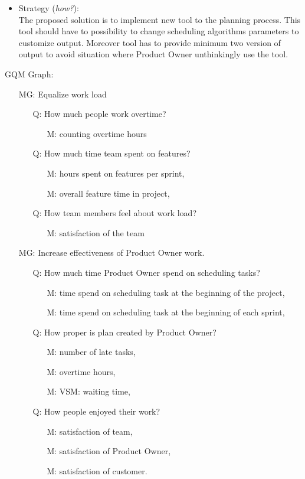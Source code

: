 \begin{itemize}
\item Strategy (\textit{how?}):\\
The proposed solution is to implement new tool to the planning process. This tool should have to possibility to change scheduling algorithms parameters to customize output. Moreover tool has to provide minimum two version of output to avoid situation where Product Owner unthinkingly use the tool.
\end{itemize}

GQM Graph:
\begin{itemize}
\item[MG:] Equalize work load
	\begin{itemize}
	\item[Q:] How much people work overtime?
    	\begin{itemize}
    	\item[M:] counting overtime hours
    	\end{itemize}
    \item[Q:] How much time team spent on features?
    	\begin{itemize}
    	\item[M:] hours spent on features per sprint,
        \item[M:] overall feature time in project,
    	\end{itemize}
    \item[Q:] How team members feel about work load?
    	\begin{itemize}
    	\item[M:] satisfaction of the team
    	\end{itemize}
	\end{itemize}
\item[MG:] Increase effectiveness of Product Owner work.
	\begin{itemize}
	\item[Q:] How much time Product Owner spend on scheduling tasks?
    	\begin{itemize}
    	\item[M:] time spend on scheduling task at the beginning of the project,
        \item[M:] time spend on scheduling task at the beginning of each sprint,
    	\end{itemize}
    \item[Q:] How proper is plan created by Product Owner?
    	\begin{itemize}
    	\item[M:] number of late tasks,
        \item[M:] overtime hours,
        \item[M:] VSM: waiting time,
    	\end{itemize}
    \item[Q:] How people enjoyed their work?
    	\begin{itemize}
    	\item[M:] satisfaction of team,
        \item[M:] satisfaction of Product Owner,
        \item[M:] satisfaction of customer.
    	\end{itemize}
	\end{itemize}
\end{itemize}
